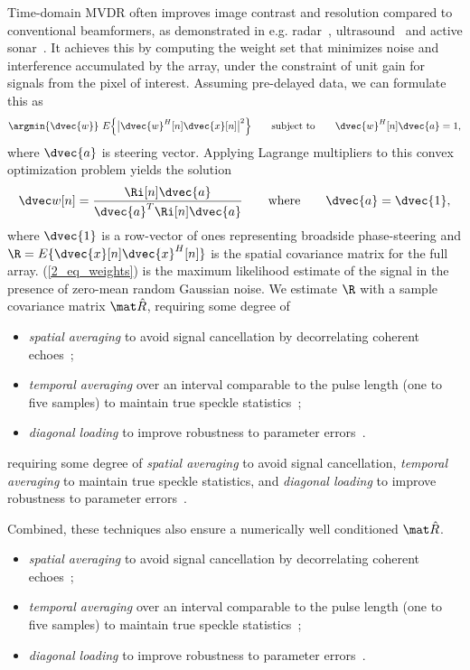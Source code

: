 {Time-domain MVDR often improves image contrast and resolution compared to conventional beamformers, as demonstrated in e.g. radar~\cite{Benitz1997}, ultrasound~\cite{Synnevag2007} and active sonar~\cite{Blomberg2013,Blomberg2012a,Dursun2009,Lo2004}. It achieves this by computing the weight set that minimizes noise and interference accumulated by the array, under the constraint of unit gain for signals from the pixel of interest. Assuming pre-delayed data, we can formulate this as
%
\begin{gather}
\argmin{\dvec{w}}\ E\Big\{\big|\dvec{w}^H[n]\dvec{x}[n]\big|^2\Big\} \qquad\text{subject to}\qquad \dvec{w}^H[n]\dvec{a} = 1, \label{2_eq_mvdr_def}
\end{gather}
%
where $\dvec{a}$ is steering vector. Applying Lagrange multipliers to this convex optimization problem yields the solution
%
\begin{gather}
\dvec w[n] = \frac{\Ri[n]\dvec{a}}{\dvec{a}^T\Ri[n]\dvec{a}} \qquad\text{where}\qquad \dvec{a}=\dvec{1}, \label{2_eq_weights}
\end{gather}
%
where $\dvec{1}$ is a row-vector of ones representing broadside phase-steering and $\R=E\{\dvec{x}[n]\dvec{x}^H[n]\}$ is the spatial covariance matrix for the full array. (\ref{2_eq_weights}) is the maximum likelihood estimate of the signal in the presence of zero-mean random Gaussian noise. We estimate $\R$ with a sample covariance matrix $\eR$, requiring some degree of
%
\begin{itemize}
\item \emph{spatial averaging} to avoid signal cancellation by decorrelating coherent echoes~\cite{Kailath1985};
\item \emph{temporal averaging} over an interval comparable to the pulse length (one to five samples) to maintain true speckle statistics~\cite{Synnevag2009a};
\item \emph{diagonal loading} to improve robustness to parameter errors~\cite{Cox1987,Maksym1979,VanTrees2002}.
\end{itemize}%

requiring some degree of \emph{spatial averaging} to avoid signal cancellation, \emph{temporal averaging} to maintain true speckle statistics, and \emph{diagonal loading} to improve robustness to parameter errors~\cite{Synnevag2009a}.

Combined, these techniques also ensure a numerically well conditioned $\eR$. 

\begin{itemize}
\item \emph{spatial averaging} to avoid signal cancellation by decorrelating coherent echoes~\cite{Kailath1985};
\item \emph{temporal averaging} over an interval comparable to the pulse length (one to five samples) to maintain true speckle statistics~\cite{Synnevag2009a};
\item \emph{diagonal loading} to improve robustness to parameter errors~\cite{Cox1987,Maksym1979}.
\end{itemize}%

}

